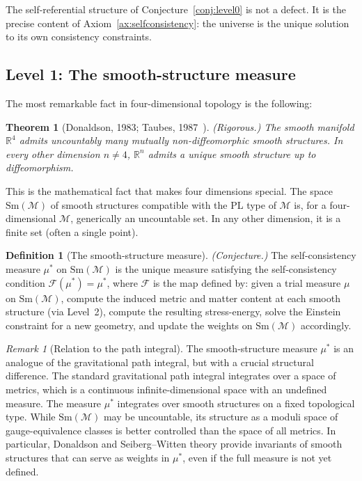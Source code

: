 \documentclass[12pt,a4paper]{article}
\newtheorem{theorem}{Theorem}
\theoremstyle{definition}
\newtheorem{definition}{Definition}
\theoremstyle{remark}
\newtheorem{remark}{Remark}
\begin{document}
The self-referential structure of Conjecture~\ref{conj:level0} is not a defect.
It is the precise content of Axiom~\ref{ax:selfconsistency}: the universe is
the unique solution to its own consistency constraints.

\subsection{Level 1: The smooth-structure measure}
\label{sec:level1}

The most remarkable fact in four-dimensional topology is the following:

\begin{theorem}[Donaldson, 1983; Taubes, 1987~\cite{donaldson,taubes}]
\emph{(Rigorous.)}
\label{thm:exotic}
The smooth manifold $\mathbb{R}^4$ admits uncountably many mutually
non-diffeomorphic smooth structures. In every other dimension $n \neq 4$,
$\mathbb{R}^n$ admits a unique smooth structure up to diffeomorphism.
\end{theorem}

This is the mathematical fact that makes four dimensions special. The space
$\mathrm{Sm}(\mathcal{M})$ of smooth structures compatible with the PL type
of $\mathcal{M}$ is, for a four-dimensional $\mathcal{M}$, generically an
uncountable set. In any other dimension, it is a finite set (often a single
point).

\begin{definition}[The smooth-structure measure]
\emph{(Conjecture.)}
\label{def:mu}
The self-consistency measure $\mu^*$ on $\mathrm{Sm}(\mathcal{M})$ is the
unique measure satisfying the self-consistency condition
$\mathcal{F}(\mu^*) = \mu^*$, where $\mathcal{F}$ is the map defined by:
given a trial measure $\mu$ on $\mathrm{Sm}(\mathcal{M})$, compute the
induced metric and matter content at each smooth structure (via Level~2),
compute the resulting stress-energy, solve the Einstein constraint for a
new geometry, and update the weights on $\mathrm{Sm}(\mathcal{M})$
accordingly.
\end{definition}

\begin{remark}[Relation to the path integral]
The smooth-structure measure $\mu^*$ is an analogue of the gravitational path
integral, but with a crucial structural difference. The standard gravitational
path integral integrates over a space of metrics, which is a continuous
infinite-dimensional space with an undefined measure. The measure $\mu^*$
integrates over smooth structures on a fixed topological type. While
$\mathrm{Sm}(\mathcal{M})$ may be uncountable, its structure as a moduli space
of gauge-equivalence classes is better controlled than the space of all metrics.
In particular, Donaldson and Seiberg--Witten theory provide invariants of smooth
structures that can serve as weights in $\mu^*$, even if the full measure is not
yet defined.
\end{remark}
\end{document}
